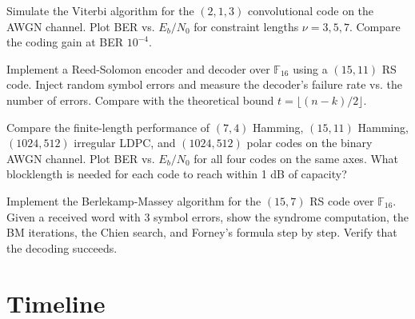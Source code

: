 \begin{exercise}[Computational]
Simulate the Viterbi algorithm for the $(2,1,3)$ convolutional code on the AWGN channel. Plot BER vs. $E_b/N_0$ for constraint lengths $\nu = 3, 5, 7$. Compare the coding gain at BER $10^{-4}$.
\end{exercise}

\begin{exercise}[Computational]
Implement a Reed-Solomon encoder and decoder over $\mathbb{F}_{16}$ using a $(15, 11)$ RS code. Inject random symbol errors and measure the decoder's failure rate vs. the number of errors. Compare with the theoretical bound $t = \lfloor (n-k)/2 \rfloor$.
\end{exercise}

\begin{exercise}[Computational]
Compare the finite-length performance of $(7,4)$ Hamming, $(15,11)$ Hamming, $(1024,512)$ irregular LDPC, and $(1024,512)$ polar codes on the binary AWGN channel. Plot BER vs. $E_b/N_0$ for all four codes on the same axes. What blocklength is needed for each code to reach within 1 dB of capacity?
\end{exercise}

\begin{exercise}[Computational]
Implement the Berlekamp-Massey algorithm for the $(15,7)$ RS code over $\mathbb{F}_{16}$. Given a received word with 3 symbol errors, show the syndrome computation, the BM iterations, the Chien search, and Forney's formula step by step. Verify that the decoding succeeds.
\end{exercise}

\section{Timeline}
\label{sec:ec:timeline}

